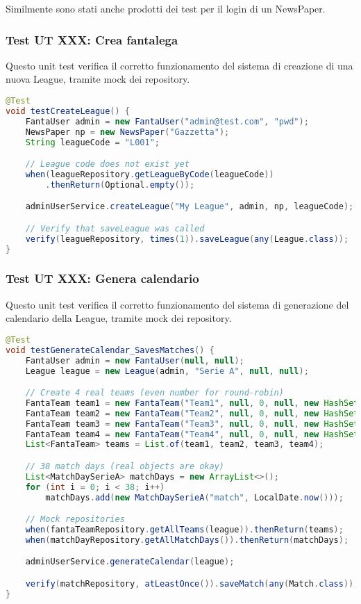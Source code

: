 Similmente sono stati anche prodotti dei test per il login di un NewsPaper.


\subsubsection{Test UT XXX: Crea fantalega}

Questo unit test verifica il corretto funzionamento del sistema di creazione di una nuova League,
tramite mock dei repository.

\begin{lstlisting}[language=Java]
@Test
void testCreateLeague() {
	FantaUser admin = new FantaUser("admin@test.com", "pwd");
	NewsPaper np = new NewsPaper("Gazzetta");
	String leagueCode = "L001";

	// League code does not exist yet
	when(leagueRepository.getLeagueByCode(leagueCode))
        .thenReturn(Optional.empty());

	adminUserService.createLeague("My League", admin, np, leagueCode);

	// Verify that saveLeague was called
	verify(leagueRepository, times(1)).saveLeague(any(League.class));
}
\end{lstlisting}


\subsubsection{Test UT XXX: Genera calendario}

Questo unit test verifica il corretto funzionamento del sistema di generazione del calendario della League,
tramite mock dei repository.

\begin{lstlisting}[language=Java]
@Test
void testGenerateCalendar_SavesMatches() {
	FantaUser admin = new FantaUser(null, null);
	League league = new League(admin, "Serie A", null, null);

	// Create 4 real teams (even number for round-robin)
	FantaTeam team1 = new FantaTeam("Team1", null, 0, null, new HashSet<>());
	FantaTeam team2 = new FantaTeam("Team2", null, 0, null, new HashSet<>());
	FantaTeam team3 = new FantaTeam("Team3", null, 0, null, new HashSet<>());
	FantaTeam team4 = new FantaTeam("Team4", null, 0, null, new HashSet<>());
	List<FantaTeam> teams = List.of(team1, team2, team3, team4);

	// 38 match days (real objects are okay)
	List<MatchDaySerieA> matchDays = new ArrayList<>();
	for (int i = 0; i < 38; i++)
		matchDays.add(new MatchDaySerieA("match", LocalDate.now()));

	// Mock repositories
	when(fantaTeamRepository.getAllTeams(league)).thenReturn(teams);
	when(matchDayRepository.getAllMatchDays()).thenReturn(matchDays);

	adminUserService.generateCalendar(league);

    verify(matchRepository, atLeastOnce()).saveMatch(any(Match.class));
}
\end{lstlisting}


